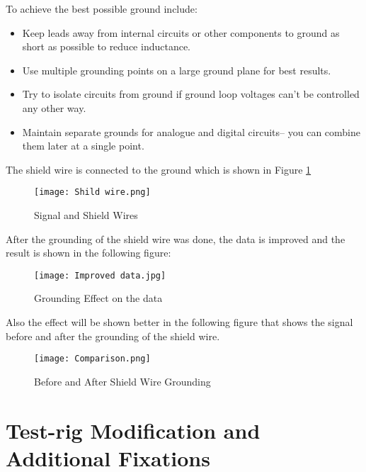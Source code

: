 To achieve the best possible ground include: 
\begin{itemize}
    \item Keep leads away from internal circuits or other components to ground as short as possible to reduce inductance.
    \item Use multiple grounding points on a large ground plane for best results. 
    \item Try to isolate circuits from ground if ground loop voltages can’t be controlled any other way.
    \item Maintain separate grounds for analogue and digital circuits-- you can combine them later at a single point\cite{ttelectronicsEMI}.
\end{itemize}

The shield wire is connected to the ground which is shown in Figure \ref{fig:Signal and Shield Wires}
\begin{figure}[H]
    \centering
    \texttt{[image: Shild wire.png]}
    \caption{Signal and Shield Wires}
    \label{fig:Signal and Shield Wires}
    
\end{figure}
 After the grounding of the shield wire was done, the data is improved and the result is shown in the following figure:
 \begin{figure}[H]
    \centering
    \texttt{[image: Improved data.jpg]}
    \caption{Grounding Effect on the data}
    \label{fig:Grounding Effect}
    
\end{figure}
\newpage
Also the effect will be shown better in the following figure  that shows the signal before and after the grounding of the shield wire.
\begin{figure}[H]
    \centering
    \texttt{[image: Comparison.png]}
    \caption{Before and After Shield Wire Grounding}
    \label{fig:Comparison}
    
\end{figure}
\newpage
\section{Test-rig Modification and Additional Fixations}
